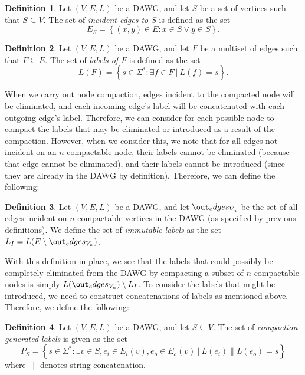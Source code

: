 \documentclass{article}
\newcommand{\emxs}[1]{\ensuremath{#1}\xspace}
\newcommand{\alphabet}{\emxs{\Sigma}}
\newcommand{\edges}{\emxs{E}}
\newcommand{\immutlabels}{\emxs{L_I}}
\newcommand{\labelfunc}{\emxs{L}}
\newcommand{\vertices}{\emxs{V}}
\newcommand{\strings}{\emxs{\alphabet^*}}
\theoremstyle{definition}
\newtheorem{definition}{Definition}
\begin{document}
\begin{definition}
  Let $(\vertices, \edges, \labelfunc)$ be a DAWG, and let $S$ be a set of
  vertices such that $S \subseteq \vertices$. The set of \emph{incident edges to
  $S$} is defined as the set
  \[
    \edges_S = \left\{ (x, y) \in \edges: x \in S \lor y \in S \right\}.
  \]
\end{definition}

\begin{definition}
  Let $(\vertices, \edges, \labelfunc)$ be a DAWG, and let $F$ be a multiset of
  edges such that $F \subseteq \edges$. The set of \emph{labels of $F$} is
  defined as the set
  \[
    \labelfunc(F) = \left\{ s \in \strings: \exists f \in F\ |\ \labelfunc(f) = s
    \right\}.
  \]
\end{definition}

When we carry out node compaction, edges incident to the compacted node will be
eliminated, and each incoming edge's label will be concatenated with each
outgoing edge's label. Therefore, we can consider for each possible node to
compact the labels that may be eliminated or introduced as a result of the
compaction. However, when we consider this, we note that for all edges not
incident on an $n$-compactable node, their labels cannot be eliminated (because
that edge cannot be eliminated), and their labels cannot be introduced (since
they are already in the DAWG by definition). Therefore, we can define the
following:

\begin{definition}
  Let $(\vertices, \edges, \labelfunc)$ be a DAWG, and let
  $\out_edges_{\vertices_n}$ be the set of all edges incident on $n$-compactable
  vertices in the DAWG (as specified by previous definitions). We define the set
  of \emph{immutable labels} as the set $\immutlabels = \labelfunc(\edges
  \setminus \out_edges_{\vertices_n})$.
\end{definition}

With this definition in place, we see that the labels that could possibly be
completely eliminated from the DAWG by compacting a subset of $n$-compactable
nodes is simply $\labelfunc(\out_edges_{\vertices_n}) \setminus \immutlabels$.
To consider the labels that might be introduced, we need to construct
concatenations of labels as mentioned above. Therefore, we define the following:

\begin{definition}
  Let $(\vertices, \edges, \labelfunc)$ be a DAWG, and let $S \subseteq
  \vertices$. The set of
  \emph{compaction-generated labels} is given as the set
  \[
    P_S = \left\{ s \in \strings: \exists v \in S, e_i \in \edges_i(v), e_o \in
    \edges_o(v)\ |\  \labelfunc(e_i) \| \labelfunc(e_o) = s \right\}
  \]
  where $\|$ denotes string concatenation.
\end{definition}
\end{document}
